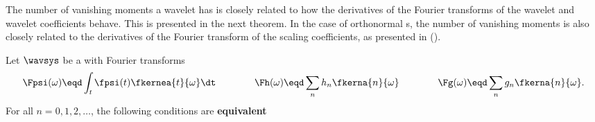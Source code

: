 The number of vanishing moments a wavelet has is closely related
to how the derivatives of the Fourier transforms of the wavelet
and wavelet coefficients behave.
This is presented in the next theorem.
In the case of orthonormal s,
the number of vanishing moments is also closely related to the
derivatives of the Fourier transform of the scaling coefficients,
as presented in
 ().
\begin{theorem}
\label{thm:vanish}
Let $\wavsys$ be a  with Fourier transforms
\[
  \Fpsi(\omega) \eqd \int_t\fpsi(t)\fkernea{t}{\omega}\dt
  \qquad\qquad
  \Fh(\omega)   \eqd \sum_n  h_n  \fkerna{n}{\omega}
  \qquad\qquad
  \Fg(\omega)   \eqd \sum_n  g_n  \fkerna{n}{\omega}.
\]
For all $n=0,1,2,\ldots$, the following conditions are
{\bf equivalent}
\end{theorem}
